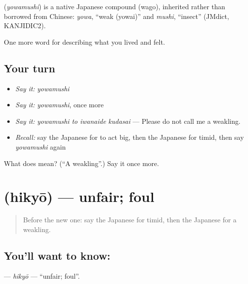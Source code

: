 \begin{cousinweb}
\textbf{} (\emph{yowamushi}) is a native Japanese compound (wago), inherited rather than borrowed from Chinese: \emph{yowa}, \textquotedblleft{}weak (yowai)\textquotedblright{} and \emph{mushi}, \textquotedblleft{}insect\textquotedblright{} (JMdict, KANJIDIC2).
\end{cousinweb}

\begin{grammarlens}[title={What you've built}]
One more word for describing what you lived and felt.
\end{grammarlens}

\subsection*{Your turn}
\begin{itemize}
\raggedright
  \item \emph{Say it:} \emph{yowamushi}
  \item \emph{Say it:} \emph{yowamushi}, once more
  \item \emph{Say it:} \emph{yowamushi to iwanaide kudasai} — Please do not call me a weakling.
  \item \emph{Recall:} say the Japanese for to act big, then the Japanese for timid, then say \emph{yowamushi} again
\end{itemize}

\begin{tcolorbox}[breakable,colback=teal!4,colframe=teal!35!black,title={Before you move on}]
What does  mean? (\textquotedblleft{}A weakling\textquotedblright{}.) Say it once more.
\end{tcolorbox}
\section[\texorpdfstring{\ja{ひきょう} (hikyō)}{ひきょう (hikyō)}]{ (hikyō) — unfair; foul}

\label{lesson:JA-C439-hikyou}



\begin{quote}
Before the new one: say the Japanese for timid, then the Japanese for a weakling.
\end{quote}

\subsection*{You'll want to know: }
\textbf{} — \emph{hikyō} — \textquotedblleft{}unfair; foul\textquotedblright{}.


